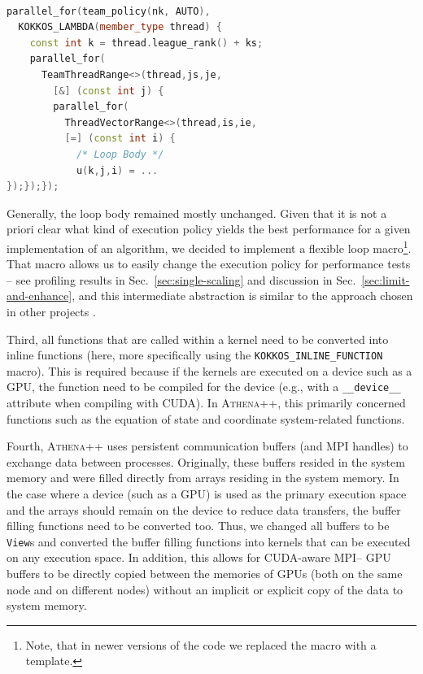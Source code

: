 \documentclass[10pt,journal,compsoc]{IEEEtran}
\newcommand{\textcode}[1]{\textsc{#1}}
\newcommand{\kokkos}{\textcode{Kokkos}\xspace}
\newcommand{\athena}{\textcode{Athena++}\xspace}
\newcommand{\cuda}{\textcode{CUDA}\xspace}
\newcommand{\mpi}{\textcode{MPI}\xspace}
\begin{document}
\begin{lstlisting}[language=C++,label=lst:TeamPolicy,caption={
Another approach using \kokkos' nested team-based parallelism
through the \lstinline!Kokkos::TeamThreadRange! and
\lstinline!Kokkos::ThreadVectorRange! classes. This interface is
closer to the underlying parallelism used by the backend such as \cuda
blocks on GPUs and SIMD vectors on CPUs.
}]

parallel_for(team_policy(nk, AUTO),
  KOKKOS_LAMBDA(member_type thread) {
    const int k = thread.league_rank() + ks;
    parallel_for(
      TeamThreadRange<>(thread,js,je,
        [&] (const int j) {
        parallel_for(
          ThreadVectorRange<>(thread,is,ie,
          [=] (const int i) {
            /* Loop Body */
            u(k,j,i) = ...
});});});
\end{lstlisting}
Generally, the loop body remained mostly unchanged.
Given that it is not a priori clear what kind of execution policy yields the best performance
for a given implementation of an algorithm, we decided to implement a flexible loop 
  macro\footnote{Note, that in newer versions of the code we replaced the macro with
  a template.}.
That macro allows us to easily change the execution policy for
performance tests -- see
profiling results in Sec.~\ref{sec:single-scaling} 
and discussion in Sec.~\ref{sec:limit-and-enhance},
and this intermediate abstraction is similar to the approach
chosen in other projects \cite{Holmen2019}.

Third, all functions that are called within a kernel need to be converted into inline
functions (here, more specifically using the \texttt{KOKKOS\_INLINE\_FUNCTION} macro).
This is required because if the kernels are executed on a device such as a GPU, the
function need to be compiled for the device (e.g., with a \texttt{\_\_device\_\_} attribute when compiling with \cuda).
In \athena, this primarily concerned functions such as the equation of state and
coordinate system-related functions.


Fourth, \athena uses persistent communication buffers (and \mpi handles) to exchange data
between processes.
Originally, these buffers resided in the system memory and were filled directly from
arrays residing in the system memory.
In the case where a device (such as a GPU) is used as the primary execution space and the arrays should
remain on the device to reduce data transfers, the buffer filling functions need to be 
converted too.
Thus, we changed all buffers to be \texttt{View}s and converted the buffer filling 
functions into kernels that can be executed on any execution space.
In addition, this allows for \cuda-aware \mpi -- GPU buffers to be directly
copied between the memories of GPUs (both on the same node and on different nodes)
without an implicit or explicit copy of the data to system memory.
\end{document}
